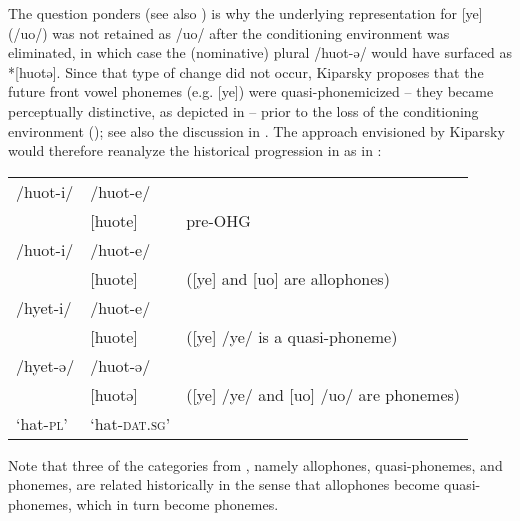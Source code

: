 The question \citet{Kiparsky2015} ponders (see also \citealt{Liberman1991}) is why the underlying representation for  [ye] (/uo/) was not retained as /uo/ after the conditioning environment was eliminated, in which case the (nominative) plural  /huot-ə/ would have surfaced as *[huotə]. Since that type of change did not occur, Kiparsky proposes that the future front vowel phonemes (e.g. [ye]) were quasi-phonemicized -- they became perceptually distinctive, as depicted in  -- prior to the loss of the conditioning environment (); see also the discussion in \citet[409ff.]{Janda2005}. The approach envisioned by Kiparsky would therefore reanalyze the historical progression in  as in :\largerpage

\ea%
    \label{ex:7:32}
    \begin{tabular}[t]{@{}lll@{}}
 \relax /huot-i/ &  /huot-e/ &                                        \\
 \relax [huoti]  &  [huote]  &  pre-OHG                               \\\tablevspace
 \relax /huot-i/ &  /huot-e/ &                                        \\
 \relax [hyeti]  &  [huote]  &  ([ye] and [uo] are allophones)        \\\tablevspace
 \relax /hyet-i/ &  /huot-e/ &                                        \\
 \relax [hyeti]  &  [huote]  &  ([ye] /ye/ is a quasi-phoneme)        \\\tablevspace
 \relax /hyet-ə/ &  /huot-ə/ &                                        \\
 \relax [hyetə]  &  [huotə]  &  ([ye] /ye/ and [uo] /uo/ are phonemes)\\
 \relax ‘hat-\textsc{pl}’   &   ‘hat\textsc{{}-dat.sg}’\\
 \end{tabular}
\z 

Note that three of the categories from , namely allophones, quasi-phonemes, and phonemes, are related historically in the sense that allophones become quasi-phonemes, which in turn become phonemes.

